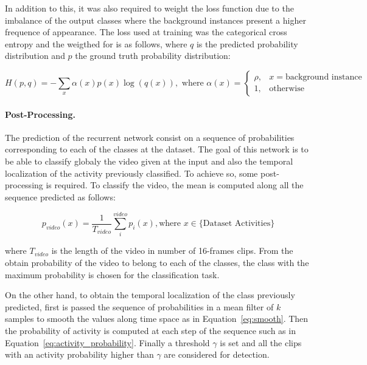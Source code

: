 \documentclass{article}
\begin{document}
In addition to this, it was also required to weight the loss function due to the imbalance of the output classes where the background instances present a higher frequence of appearance. The loss used at training was the categorical cross entropy and the weigthed for is as follows, where $q$ is the predicted probability distribution and $p$ the ground truth probability distribution:

\begin{equation}
    H(p,q) = - \sum_x \alpha(x) p(x) \log (q(x)), \text{ where } \alpha(x) =
    \begin{cases}
        \rho, & x = \text{background instance}\\
        1,    & \text{otherwise}
    \end{cases}
\end{equation}

\paragraph{Post-Processing.}
The prediction of the recurrent network consist on a sequence of probabilities corresponding to each of the classes at the dataset.
The goal of this network is to be able to classify globaly the video given at the input and also the temporal localization of the activity previously classified. To achieve so, some post-processing is required. To classify the video, the mean is computed along all the sequence predicted as follows:

\begin{equation}
	p_{video}(x) = \frac{1}{T_{video}} \sum_i^{video} p_i(x), \text{where } x \in \{ \text{Dataset Activities}\}
\end{equation}

where $T_{video}$ is the length of the video in number of 16-frames clips. From the obtain probability of the video to belong to each of the classes, the class with the maximum probability is chosen for the classification task.

On the other hand, to obtain the temporal localization of the class previously predicted, first is passed the sequence of probabilities in a mean filter of $k$ samples to smooth the values along time space as in Equation~\ref{eq:smooth}. Then the probability of activity is computed at each step of the sequence such as in Equation~\ref{eq:activity_probability}. Finally a threshold $\gamma$ is set and all the clips with an activity probability higher than $\gamma$ are considered for detection.
\end{document}
